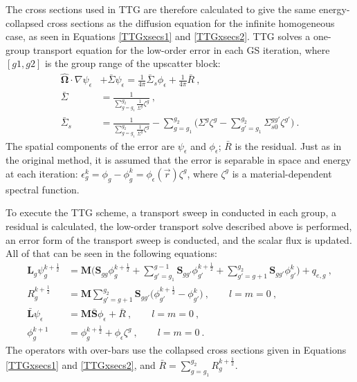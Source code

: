 \documentclass[12pt]{article}
\newcommand{\ve}[1]{\ensuremath{\mathbf{#1}}}
\newcommand{\Macro}{\ensuremath{\Sigma}}
\begin{document}
The cross sections used in TTG are therefore calculated to give the same energy-collapsed cross sections as the diffusion equation for the infinite homogeneous case, as seen in Equations \eqref{TTGxsecs1} and \eqref{TTGxsecs2}. TTG solves a one-group transport equation for the low-order error in each GS iteration, where $[g1, g2]$ is the group range of the upscatter block:
%
\begin{align}
  \ve{\hat{\Omega}} \cdot \nabla \psi_{\epsilon} &+ \bar{\Macro}\psi_{\epsilon} = \frac{1}{4\pi}\bar{\Macro}_{s}\phi_{\epsilon} + \frac{1}{4\pi}\bar{R} \:, \\
  \bar{\Macro} &= \frac{1}{\sum_{g=g_1}^{g_2} \frac{1}{\Macro^g}\zeta^g} \label{TTGxsecs1} \:,\\
  \bar{\Macro}_{s} &= \frac{1}{\sum_{g=g_1}^{g_2} \frac{1}{\Macro^g}\zeta^g} - \sum_{g=g_1}^{g_2} \bigl(\Macro^g\zeta^g - \sum_{g'=g_1}^{g_2} \Macro_{s0}^{gg'} \zeta^{g'} \bigr) \label{TTGxsecs2} \:. 
\end{align}
%
The spatial components of the error are $\psi_{\epsilon}$ and $\phi_{\epsilon}$; $\bar{R}$ is the residual. Just as in the original method, it is assumed that the error is separable in space and energy at each iteration: $\epsilon_g^k = \phi_g - \phi_g^k = \phi_{\epsilon}(\vec{r})\zeta^g$, where $\zeta^g$ is a material-dependent spectral function.%

To execute the TTG scheme, a transport sweep in conducted in each group, a residual is calculated, the low-order transport solve described above is performed, an error form of the transport sweep is conducted, and the scalar flux is updated. All of that can be seen in the following equations: 
\begin{align}
  \ve{L}_g \psi_g^{k+\frac{1}{2}} &= \ve{M}\bigl(\ve{S}_{gg}\phi_g^{k+\frac{1}{2}} + \sum_{g'=g_1}^{g-1} \ve{S}_{gg'}\phi_{g'}^{k+\frac{1}{2}} + \sum_{g'=g+1}^{g_2}\ve{S}_{gg'}\phi_{g'}^k \bigr) + q_{e,g}  \:, \\
  R^{k+\frac{1}{2}}_g &= \ve{M} \sum_{g'=g+1}^{g_2}\ve{S}_{gg'} \bigl( \phi_{g'}^{k+\frac{1}{2}} - \phi_{g'}^k \bigr) \:, \qquad l = m = 0 \:, \\
  \bar{\ve{L}}\psi_{\epsilon} &= \ve{M\bar{S}} \phi_{\epsilon} + \bar{R} \:, \qquad l = m = 0 \:, \label{TTGerrorEqn} \\
  \phi_g^{k+1} &= \phi_{g}^{k+\frac{1}{2}} + \phi_{\epsilon}\zeta^g \:, \qquad l = m = 0 \:.
\end{align}
The operators with over-bars use the collapsed cross sections given in Equations \eqref{TTGxsecs1} and \eqref{TTGxsecs2}, and $\bar{R} = \sum_{g=g_1}^{g_2} R_g^{k+\frac{1}{2}}$. 
\end{document}
